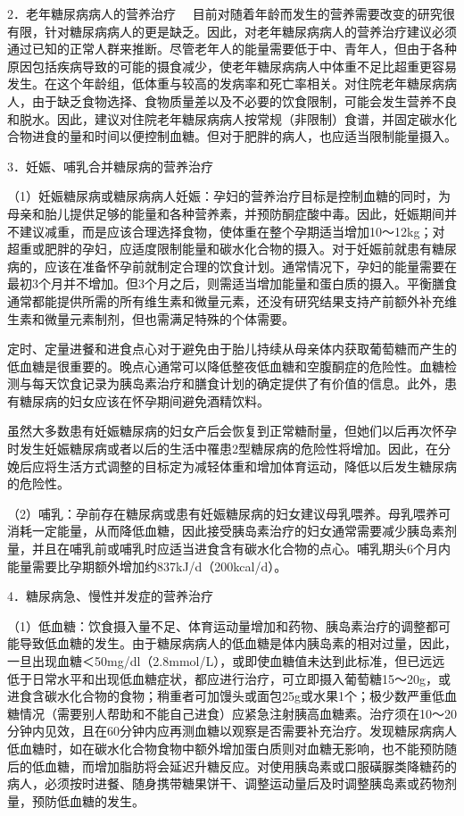 {2．老年糖尿病病人的营养治疗}
　目前对随着年龄而发生的营养需要改变的研究很有限，针对糖尿病病人的更是缺乏。因此，对老年糖尿病病人的营养治疗建议必须通过已知的正常人群来推断。尽管老年人的能量需要低于中、青年人，但由于各种原因包括疾病导致的可能的摄食减少，使老年糖尿病病人中体重不足比超重更容易发生。在这个年龄组，低体重与较高的发病率和死亡率相关。对住院老年糖尿病病人，由于缺乏食物选择、食物质量差以及不必要的饮食限制，可能会发生营养不良和脱水。因此，建议对住院老年糖尿病病人按常规（非限制）食谱，并固定碳水化合物进食的量和时间以便控制血糖。但对于肥胖的病人，也应适当限制能量摄入。

{3．妊娠、哺乳合并糖尿病的营养治疗}

（1）妊娠糖尿病或糖尿病病人妊娠：孕妇的营养治疗目标是控制血糖的同时，为母亲和胎儿提供足够的能量和各种营养素，并预防酮症酸中毒。因此，妊娠期间并不建议减重，而是应该合理选择食物，使体重在整个孕期适当增加10～12kg；对超重或肥胖的孕妇，应适度限制能量和碳水化合物的摄入。对于妊娠前就患有糖尿病的，应该在准备怀孕前就制定合理的饮食计划。通常情况下，孕妇的能量需要在最初3个月并不增加。但3个月之后，则需适当增加能量和蛋白质的摄入。平衡膳食通常都能提供所需的所有维生素和微量元素，还没有研究结果支持产前额外补充维生素和微量元素制剂，但也需满足特殊的个体需要。

定时、定量进餐和进食点心对于避免由于胎儿持续从母亲体内获取葡萄糖而产生的低血糖是很重要的。晚点心通常可以降低整夜低血糖和空腹酮症的危险性。血糖检测与每天饮食记录为胰岛素治疗和膳食计划的确定提供了有价值的信息。此外，患有糖尿病的妇女应该在怀孕期间避免酒精饮料。

虽然大多数患有妊娠糖尿病的妇女产后会恢复到正常糖耐量，但她们以后再次怀孕时发生妊娠糖尿病或者以后的生活中罹患2型糖尿病的危险性将增加。因此，在分娩后应将生活方式调整的目标定为减轻体重和增加体育运动，降低以后发生糖尿病的危险性。

（2）哺乳：孕前存在糖尿病或患有妊娠糖尿病的妇女建议母乳喂养。母乳喂养可消耗一定能量，从而降低血糖，因此接受胰岛素治疗的妇女通常需要减少胰岛素剂量，并且在哺乳前或哺乳时应适当进食含有碳水化合物的点心。哺乳期头6个月内能量需要比孕期额外增加约837kJ/d（200kcal/d）。

{4．糖尿病急、慢性并发症的营养治疗}

（1）低血糖：饮食摄入量不足、体育运动量增加和药物、胰岛素治疗的调整都可能导致低血糖的发生。由于糖尿病病人的低血糖是体内胰岛素的相对过量，因此，一旦出现血糖＜50mg/dl（2.8mmol/L），或即使血糖值未达到此标准，但已远远低于日常水平和出现低血糖症状，都应进行治疗，可立即摄入葡萄糖15～20g，或进食含碳水化合物的食物；稍重者可加馒头或面包25g或水果1个；极少数严重低血糖情况（需要别人帮助和不能自己进食）应紧急注射胰高血糖素。治疗须在10～20分钟内见效，且在60分钟内应再测血糖以观察是否需要补充治疗。发现糖尿病病人低血糖时，如在碳水化合物食物中额外增加蛋白质则对血糖无影响，也不能预防随后的低血糖，而增加脂肪将会延迟升糖反应。对使用胰岛素或口服磺脲类降糖药的病人，必须按时进餐、随身携带糖果饼干、调整运动量后及时调整胰岛素或药物剂量，预防低血糖的发生。

